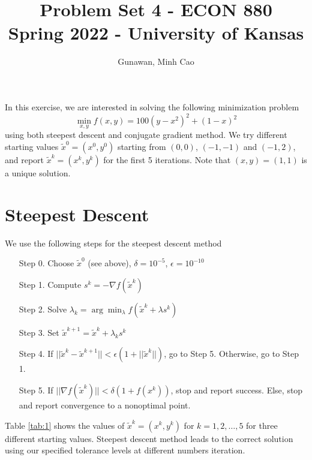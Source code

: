 \documentclass[11pt]{article}
\title{Problem Set 4 - ECON 880\\
	\small Spring 2022 - University of Kansas}
\author{Gunawan, Minh Cao}
\newcommand{\1}{\mathbbm{1}}
\begin{document}
\maketitle	

\noindent In this exercise, we are interested in solving the following minimization problem
\[\min_{x,y} f(x,y)=100(y-x^2)^2+(1-x)^2\]
using both steepest descent and conjugate gradient method. We try different starting values $\tilde{x}^0=(x^0,y^0)$ starting from $(0,0)$, $(-1,-1)$
and $(-1,2)$, and report $\tilde{x}^k=(x^k,y^k)$ for the first 5 iterations. Note that $(x,y)=(1,1)$ is a unique solution.

\section{Steepest Descent}
We use the following steps for the steepest descent method
\begin{enumerate}
	\item[Step 0.] Choose $\tilde{x}^0$ (see above), $\delta = 10^{-5}$, $\epsilon = 10^{-10}$  
	\item[Step 1.] Compute $s^k=-\nabla f(\tilde{x}^k)$
	\item[Step 2.] Solve $\lambda_k=\arg \min_{\lambda} f(\tilde{x}^k+\lambda s^k)$
	\item[Step 3.] Set $\tilde{x}^{k+1}=\tilde{x}^k+\lambda_k s^k$
	\item[Step 4.] If $||\tilde{x}^{k}-\tilde{x}^{k+1}||<\epsilon (1+||\tilde{x}^{k}||)$, go to Step 5. Otherwise, go to Step 1.
	\item[Step 5.] If $||\nabla f(\tilde{x}^k)||<\delta(1+f(x^k))$, stop and report success. Else, stop and report convergence to a nonoptimal point.
\end{enumerate}
Table \ref{tab:1} shows the values of $\tilde{x}^k=(x^k,y^k)$ for $k=1,2,\ldots,5$ for three different starting values. Steepest descent method leads to the correct solution using our specified tolerance levels at different numbers iteration.  
\end{document}
